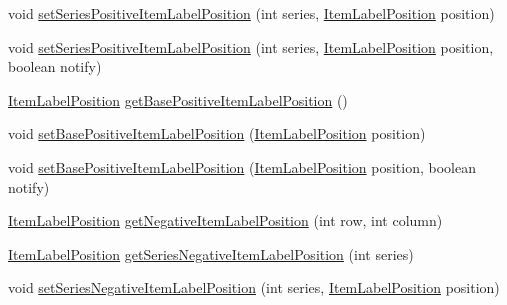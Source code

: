 \begin{DoxyCompactItemize}
\item 
void \mbox{\hyperlink{interfaceorg_1_1jfree_1_1chart_1_1renderer_1_1xy_1_1_x_y_item_renderer_a7a1e864e31d83a6f87499e6be32f66e7}{set\+Series\+Positive\+Item\+Label\+Position}} (int series, \mbox{\hyperlink{classorg_1_1jfree_1_1chart_1_1labels_1_1_item_label_position}{Item\+Label\+Position}} position)
\item 
void \mbox{\hyperlink{interfaceorg_1_1jfree_1_1chart_1_1renderer_1_1xy_1_1_x_y_item_renderer_a472383ed6074fbcbf6803c5d90dc90ff}{set\+Series\+Positive\+Item\+Label\+Position}} (int series, \mbox{\hyperlink{classorg_1_1jfree_1_1chart_1_1labels_1_1_item_label_position}{Item\+Label\+Position}} position, boolean notify)
\item 
\mbox{\hyperlink{classorg_1_1jfree_1_1chart_1_1labels_1_1_item_label_position}{Item\+Label\+Position}} \mbox{\hyperlink{interfaceorg_1_1jfree_1_1chart_1_1renderer_1_1xy_1_1_x_y_item_renderer_a9a5bf99da72e6e4c93c3e7dfc087b038}{get\+Base\+Positive\+Item\+Label\+Position}} ()
\item 
void \mbox{\hyperlink{interfaceorg_1_1jfree_1_1chart_1_1renderer_1_1xy_1_1_x_y_item_renderer_ad075045810d227c773e0ad296ad5b4dd}{set\+Base\+Positive\+Item\+Label\+Position}} (\mbox{\hyperlink{classorg_1_1jfree_1_1chart_1_1labels_1_1_item_label_position}{Item\+Label\+Position}} position)
\item 
void \mbox{\hyperlink{interfaceorg_1_1jfree_1_1chart_1_1renderer_1_1xy_1_1_x_y_item_renderer_a10f957f608d9c7f57e2405c09dc2072f}{set\+Base\+Positive\+Item\+Label\+Position}} (\mbox{\hyperlink{classorg_1_1jfree_1_1chart_1_1labels_1_1_item_label_position}{Item\+Label\+Position}} position, boolean notify)
\item 
\mbox{\hyperlink{classorg_1_1jfree_1_1chart_1_1labels_1_1_item_label_position}{Item\+Label\+Position}} \mbox{\hyperlink{interfaceorg_1_1jfree_1_1chart_1_1renderer_1_1xy_1_1_x_y_item_renderer_a958e8cdbe6dd3eeebad86e0d765ae6c2}{get\+Negative\+Item\+Label\+Position}} (int row, int column)
\item 
\mbox{\hyperlink{classorg_1_1jfree_1_1chart_1_1labels_1_1_item_label_position}{Item\+Label\+Position}} \mbox{\hyperlink{interfaceorg_1_1jfree_1_1chart_1_1renderer_1_1xy_1_1_x_y_item_renderer_a0f0aff12d691d7b3715e2d1f461d1441}{get\+Series\+Negative\+Item\+Label\+Position}} (int series)
\item 
void \mbox{\hyperlink{interfaceorg_1_1jfree_1_1chart_1_1renderer_1_1xy_1_1_x_y_item_renderer_ad38b027443db1d0eec0a0367f341450a}{set\+Series\+Negative\+Item\+Label\+Position}} (int series, \mbox{\hyperlink{classorg_1_1jfree_1_1chart_1_1labels_1_1_item_label_position}{Item\+Label\+Position}} position)

\end{DoxyCompactItemize}
